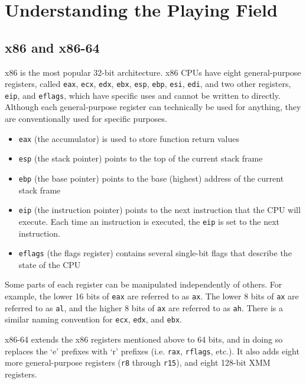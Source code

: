 \documentclass{article}
\begin{document}
\section{Understanding the Playing Field}
\subsection{x86 and x86-64}
x86 is the most popular 32-bit architecture. x86 CPUs have eight general-purpose
registers, called \texttt{eax}, \texttt{ecx}, \texttt{edx}, \texttt{ebx},
\texttt{esp}, \texttt{ebp}, \texttt{esi}, \texttt{edi}, and two other registers,
\texttt{eip}, and \texttt{eflags}, which have specific uses and cannot be
written to directly. Although each general-purpose register can technically be
used for anything, they are conventionally used for specific purposes.

\begin{itemize}
    \item \texttt{eax} (the accumulator) is used to store function return values 
    \item \texttt{esp} (the stack pointer) points to the top of the current
        stack frame 
    \item \texttt{ebp} (the base pointer) points to the base (highest) address
        of the current stack frame 
    \item \texttt{eip} (the instruction pointer) points to the next instruction
        that the CPU will execute. Each time an instruction is executed, the
        \texttt{eip} is set to the next instruction.
    \item \texttt{eflags} (the flags register) contains several single-bit flags
        that describe the state of the CPU
\end{itemize}

Some parts of each register can be manipulated independently of others. For
example, the lower 16 bits of \texttt{eax} are referred to as \texttt{ax}. The
lower 8 bits of \texttt{ax} are referred to as \texttt{al}, and the higher 8
bits of \texttt{ax} are referred to as \texttt{ah}. There is a similar naming
convention for \texttt{ecx}, \texttt{edx}, and \texttt{ebx}.

x86-64 extends the x86 registers mentioned above to 64 bits, and in doing so
replaces the `e' prefixes with `r' prefixes (i.e. \texttt{rax}, \texttt{rflags},
etc.). It also adds eight more general-purpose registers (\texttt{r8} through
\texttt{r15}), and eight 128-bit XMM registers.
\end{document}
